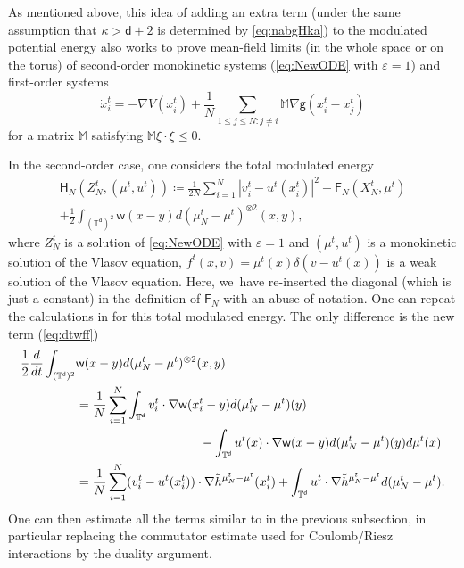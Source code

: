 \documentclass[JEP,XML,SOM,Unicode,published]{cedram}
\theoremstyle{plain}
\theoremstyle{definition}
\newcommand{\M}{{\mathbb{M}}}
\newcommand{\T}{{\mathbb{T}}}
\let\vep\varepsilon
\let\ka\kappa
\let\nab\nabla
\let\tl\tilde
\let\ux X
\newcommand{\Fr}{\mathsf{F}}
\renewcommand{\d}{\mathsf{d}}
\newcommand{\g}{{\mathsf{g}}}
\newcommand{\w}{\mathsf{w}}
\begin{document}
As mentioned above, this idea of adding an extra term (under the same assumption that $\ka>\d+2$ is determined by \eqref{eq:nabgHka}) to the modulated potential energy also works to prove mean-field limits (in the whole space or on the torus) of second-order monokinetic systems (\ie \eqref{eq:NewODE} with $\vep=1$) and first-order systems
\begin{equation}\label{eq:ODEfo}
\dot{x}_i^t = -\nab V(x_i^t) + \frac1N\sum_{1\le j\le N: j\ne i}\M\nab\g(x_i^t-x_j^t)
\end{equation}
for a matrix $\M$ satisfying $\M\xi\cdot\xi\le 0$.

In the second-order case, one considers the total modulated energy
\begin{multline*}
\mathsf{H}_N(Z_N^t,(\mu^t,u^t)) \coloneqq \frac{1}{2N}\sum_{i=1}^N |v_i^t-u^t(x_i^t)|^2 + \Fr_N(\ux_N^t,\mu^t) \\
+\frac{1}{2}\int_{(\T^\d)^2}\w(x-y)d(\mu_N^t-\mu^t)^{\otimes 2}(x,y),
\end{multline*}
where $Z_N^t$ is a solution of \eqref{eq:NewODE} with $\vep=1$ and $(\mu^t,u^t)$ is a monokinetic solution of the Vlasov equation, \ie $f^t(x,v) = \mu^t(x)\delta(v-u^t(x))$ is a weak solution of the Vlasov equation. Here, we~have re-inserted the diagonal (which is just a constant) in the definition of $\Fr_N$ with an abuse of notation. One can repeat the calculations in \cite[App.]{Serfaty2020} for this total modulated energy. The only difference is the new term (\cf \eqref{eq:dtwff})
\begin{align*}
\frac12\frac{d}{dt}\int_{(\T^\d)^2}&\w(x-y)d(\mu_N^t - \mu^t)^{\otimes 2}(x,y)\\
&= \frac1N\sum_{i=1}^N\int_{\T^\d}v_i^t\cdot\nab\w(x_i^t-y)d(\mu_N^t-\mu^t)(y)\\
&\hspace*{3.5cm} - \int_{\T^\d}u^t(x)\cdot\nab\w(x-y)d(\mu_N^t-\mu^t)(y)d\mu^t(x)\\
&= \frac1N\sum_{i=1}^N(v_i^t-u^t(x_i^t)) \cdot \nab\tl{h}^{\mu_N^t-\mu^t}(x_i^t) + \int_{\T^\d}u^t\cdot\nab\tl{h}^{\mu_N^t-\mu^t} d(\mu_N^t-\mu^t).
\end{align*}
One can then estimate all the terms similar to in the previous subsection, in particular replacing the commutator estimate used for Coulomb/Riesz interactions by the duality argument.
\end{document}
